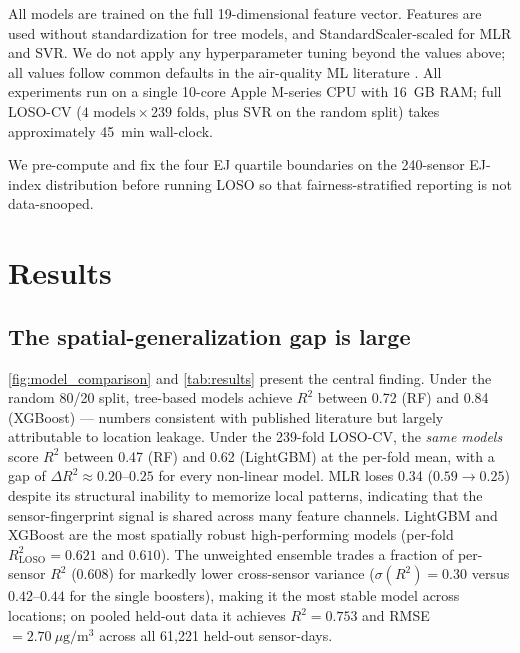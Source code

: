 \documentclass{article}
\begin{document}
All models are trained on the full 19-dimensional feature vector. Features are used without standardization for tree models, and StandardScaler-scaled for MLR and SVR. We do not apply any hyperparameter tuning beyond the values above; all values follow common defaults in the air-quality ML literature \citep{ghahremanloo2021, zhang2024unmasking}. All experiments run on a single 10-core Apple M-series CPU with 16~GB RAM; full LOSO-CV ($4 \text{ models} \times 239 \text{ folds}$, plus SVR on the random split) takes approximately \SI{45}{min} wall-clock.

We pre-compute and fix the four EJ quartile boundaries on the 240-sensor EJ-index distribution before running LOSO so that fairness-stratified reporting is not data-snooped.

\section{Results}
\label{sec:results}

\subsection{The spatial-generalization gap is large}

\autoref{fig:model_comparison} and \autoref{tab:results} present the central finding. Under the random 80/20 split, tree-based models achieve $R^2$ between 0.72 (RF) and 0.84 (XGBoost) --- numbers consistent with published literature but largely attributable to location leakage. Under the 239-fold LOSO-CV, the \emph{same models} score $R^2$ between 0.47 (RF) and 0.62 (LightGBM) at the per-fold mean, with a gap of $\Delta R^2 \approx 0.20$--$0.25$ for every non-linear model. MLR loses 0.34 ($0.59 \rightarrow 0.25$) despite its structural inability to memorize local patterns, indicating that the sensor-fingerprint signal is shared across many feature channels. LightGBM and XGBoost are the most spatially robust high-performing models (per-fold $R^2_{\mathrm{LOSO}} = 0.621$ and $0.610$). The unweighted ensemble trades a fraction of per-sensor $R^2$ (0.608) for markedly lower cross-sensor variance ($\sigma(R^2) = 0.30$ versus $0.42$--$0.44$ for the single boosters), making it the most stable model across locations; on pooled held-out data it achieves $R^2 = 0.753$ and RMSE$=2.70~\mu\mathrm{g}/\mathrm{m}^3$ across all 61{,}221 held-out sensor-days.
\end{document}
